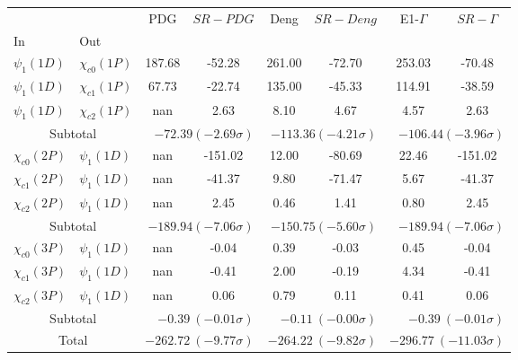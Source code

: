 \begin{tabular}{|l|l|c|c|c|c|c|c|}%
\hline%
&&PDG&$SR-PDG$&Deng&$SR-Deng$&E1-$\Gamma$&$SR-\Gamma$\\%
In&Out&&&&&&\\%
\hline%
$\psi_{1}(1D)$&$\chi_{c0}(1P)$&187.68&-52.28&261.00&-72.70&253.03&-70.48\\%
$\psi_{1}(1D)$&$\chi_{c1}(1P)$&67.73&-22.74&135.00&-45.33&114.91&-38.59\\%
$\psi_{1}(1D)$&$\chi_{c2}(1P)$&nan&2.63&8.10&4.67&4.57&2.63\\%
\hline%
\hline%
\multicolumn{2}{|c|}{Subtotal}&\multicolumn{2}{|r|}{$-72.39 (-2.69\sigma)$}&\multicolumn{2}{|r|}{$-113.36 (-4.21\sigma)$}&\multicolumn{2}{|r|}{$-106.44 (-3.96\sigma)$}\\%
\hline%
\hline%
$\chi_{c0}(2P)$&$\psi_{1}(1D)$&nan&-151.02&12.00&-80.69&22.46&-151.02\\%
$\chi_{c1}(2P)$&$\psi_{1}(1D)$&nan&-41.37&9.80&-71.47&5.67&-41.37\\%
$\chi_{c2}(2P)$&$\psi_{1}(1D)$&nan&2.45&0.46&1.41&0.80&2.45\\%
\hline%
\hline%
\multicolumn{2}{|c|}{Subtotal}&\multicolumn{2}{|r|}{$-189.94 (-7.06\sigma)$}&\multicolumn{2}{|r|}{$-150.75 (-5.60\sigma)$}&\multicolumn{2}{|r|}{$-189.94 (-7.06\sigma)$}\\%
\hline%
\hline%
$\chi_{c0}(3P)$&$\psi_{1}(1D)$&nan&-0.04&0.39&-0.03&0.45&-0.04\\%
$\chi_{c1}(3P)$&$\psi_{1}(1D)$&nan&-0.41&2.00&-0.19&4.34&-0.41\\%
$\chi_{c2}(3P)$&$\psi_{1}(1D)$&nan&0.06&0.79&0.11&0.41&0.06\\%
\hline%
\hline%
\multicolumn{2}{|c|}{Subtotal}&\multicolumn{2}{|r|}{$-0.39~(-0.01\sigma)$}&\multicolumn{2}{|r|}{$-0.11~(-0.00\sigma)$}&\multicolumn{2}{|r|}{$-0.39~(-0.01\sigma)$}\\%
\hline%
\hline%
\multicolumn{2}{|c|}{Total}&\multicolumn{2}{|r|}{$-262.72~(-9.77\sigma)$}&\multicolumn{2}{|r|}{$-264.22~(-9.82\sigma)$}&\multicolumn{2}{|r|}{$-296.77~(-11.03\sigma)$}\\%
\hline%
\end{tabular}